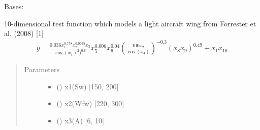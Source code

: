 \documentclass[letterpaper,10pt,english,openany,oneside]{sphinxmanual}
\begin{document}
\begin{fulllineitems}
\label{\detokenize{pygpc.testfunctions:pygpc.testfunctions.testfunctions.WingWeight}}
Bases: {\hyperref[\detokenize{pygpc:pygpc.AbstractModel.AbstractModel}]{}}

10-dimensional test function which models a light aircraft wing from Forrester et al. (2008) {[}1{]}
\begin{equation*}
\begin{split}y = \frac{0.036 x_1^{0.758} x_2^{0.0035} x_3}{\cos(x_4)^2)^{0.6}} x_5^{0.006} x_6^{0.04}
\left( \frac{100 x_7}{\cos(x_4)}\right)^{-0.3} (x_8 x_9)^{0.49} + x_1 x_{10}\end{split}
\end{equation*}\begin{quote}\begin{description}
\item[{Parameters}] \leavevmode\begin{itemize}
\item {} 
\sphinxstyleliteralstrong{\sphinxupquote{{[}}}\sphinxstyleliteralstrong{\sphinxupquote{{]}}} (\sphinxstyleliteralemphasis{\sphinxupquote{ {[}}}\sphinxstyleliteralemphasis{\sphinxupquote{{]}}}) \textendash{} x1(Sw) {[}150, 200{]}

\item {} 
\sphinxstyleliteralstrong{\sphinxupquote{{[}}}\sphinxstyleliteralstrong{\sphinxupquote{{]}}} (\sphinxstyleliteralemphasis{\sphinxupquote{ {[}}}\sphinxstyleliteralemphasis{\sphinxupquote{{]}}}) \textendash{} x2(Wfw) {[}220, 300{]}

\item {} 
\sphinxstyleliteralstrong{\sphinxupquote{{[}}}\sphinxstyleliteralstrong{\sphinxupquote{{]}}} (\sphinxstyleliteralemphasis{\sphinxupquote{ {[}}}\sphinxstyleliteralemphasis{\sphinxupquote{{]}}}) \textendash{} x3(A) {[}6, 10{]}


\end{itemize}
\end{description}
\end{quote}
\end{fulllineitems}
\end{document}
